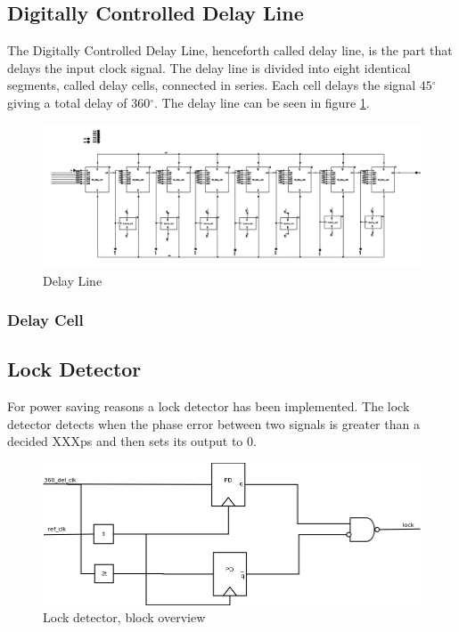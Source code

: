 \documentclass[a4paper,12pt]{article} \usepackage{graphicx}
\newcommand{\degree}{\ensuremath{^\circ}}
\begin{document}
\subsection{Digitally Controlled Delay Line}
The Digitally Controlled Delay Line, henceforth called delay line, is the part
that delays the input clock signal. The delay line is divided into eight
identical segments, called delay cells, connected in series. Each cell delays the signal 
$45\degree$ giving a total delay of 360\degree. The delay line can be seen in
figure \ref{fig:del_line}.
\begin{figure}[h]
        \centering
        \includegraphics[width=\textwidth]{../Bilder/Delay_Line/Delay_line_top.png}
        \caption{Delay Line}
        \label{fig:del_line}
\end{figure}
\subsubsection{Delay Cell}

\subsection{Lock Detector}
For power saving reasons a lock detector has been implemented. The
lock detector detects when the phase error between two signals is
greater than a decided XXXps and then sets its output to 0.


\begin{figure}[h]
        \centering
        \includegraphics[width=150mm]{../Bilder/Lockdetector.png}
        \caption{Lock detector, block overview}
        \label{fig:LD_block}
\end{figure}
\end{document}
